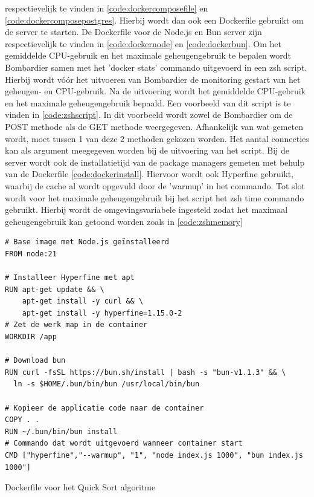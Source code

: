 respectievelijk te vinden in \ref{code:dockercomposefile} en \ref{code:dockercomposepostgres}.
Hierbij wordt dan ook een Dockerfile gebruikt om de server te starten. De Dockerfile voor de Node.js en Bun server 
zijn respectievelijk te vinden in \ref{code:dockernode} en \ref{code:dockerbun}. 
Om het gemiddelde CPU-gebruik en het maximale geheugengebruik te bepalen wordt Bombardier samen met het 'docker stats' commando uitgevoerd in een zsh script.
Hierbij wordt vóór het uitvoeren van Bombardier de monitoring gestart van het geheugen- en CPU-gebruik. 
Na de uitvoering wordt het gemiddelde CPU-gebruik en het maximale geheugengebruik bepaald.
Een voorbeeld van dit script is te vinden in \ref{code:zshscript}. 
In dit voorbeeld wordt zowel de Bombardier om de POST methode als de GET methode weergegeven. Afhankelijk van wat gemeten wordt, moet tussen 1 van deze 2 methoden gekozen worden.
Het aantal connecties kan als argument meegegeven worden bij de uitvoering van het script.
Bij de server wordt ook de installatietijd van de package managers gemeten met behulp van de Dockerfile \ref{code:dockerinstall}.
Hiervoor wordt ook Hyperfine gebruikt, waarbij de cache al wordt opgevuld door de 'warmup' in het commando.
Tot slot wordt voor het maximale geheugengebruik bij het script het zsh time commando gebruikt. Hierbij wordt de omgevingsvariabele 
ingesteld zodat het maximaal geheugengebruik kan getoond worden zoals in \ref{code:zshmemory}
\begin{listing}[H]
  \centering
  \begin{verbatim}
# Base image met Node.js geïnstalleerd
FROM node:21

# Installeer Hyperfine met apt
RUN apt-get update && \
    apt-get install -y curl && \
    apt-get install -y hyperfine=1.15.0-2
# Zet de werk map in de container
WORKDIR /app

# Download bun
RUN curl -fsSL https://bun.sh/install | bash -s "bun-v1.1.3" && \
  ln -s $HOME/.bun/bin/bun /usr/local/bin/bun

# Kopieer de applicatie code naar de container
COPY . .
RUN ~/.bun/bin/bun install
# Commando dat wordt uitgevoerd wanneer container start
CMD ["hyperfine","--warmup", "1", "node index.js 1000", "bun index.js 1000"]
      \end{verbatim}
      \caption{\label{code:dockerscript}Dockerfile voor het Quick Sort algoritme}
\end{listing}
